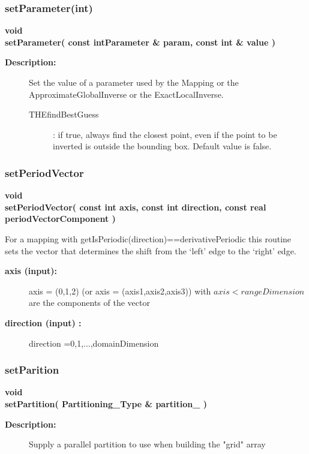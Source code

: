\subsubsection{setParameter(int)}
 
\begin{flushleft} \textbf{%
void  \\ 
\settowidth{\MappingIncludeArgIndent}{setParameter(}%
setParameter( const  intParameter \& param, const int \& value ) 
}\end{flushleft}
\begin{description}
\item[{\bf Description:}] 
   Set the value of a parameter used by the Mapping or the ApproximateGlobalInverse or the ExactLocalInverse.
 
 \begin{description}
  \item[THEfindBestGuess] : if true, always find the closest point, even if the point to be inverted
    is outside the bounding box. Default value is false.
 \end{description}

 
\end{description}
\subsubsection{setPeriodVector}
 
\begin{flushleft} \textbf{%
void  \\ 
\settowidth{\MappingIncludeArgIndent}{setPeriodVector(}%
setPeriodVector( const int axis, const int direction, const real periodVectorComponent  )
}\end{flushleft}
  For a mapping with getIsPeriodic(direction)==derivativePeriodic this routine sets
 the vector that determines the shift from the `left' edge to the `right' edge.
\begin{description}
\item[{\bf axis (input):}]  axis = (0,1,2) (or axis = (axis1,axis2,axis3)) with $axis<rangeDimension$
      are the components of the vector 
\item[{\bf direction (input) :}]  direction =0,1,...,domainDimension
\end{description}
\subsubsection{setParition}
 
\begin{flushleft} \textbf{%
void  \\ 
\settowidth{\MappingIncludeArgIndent}{setPartition(}%
setPartition( Partitioning\_Type \& partition\_ )
}\end{flushleft}
\begin{description}
\item[{\bf Description:}] 
   Supply a parallel partition to use when building the "grid" array
\end{description}
